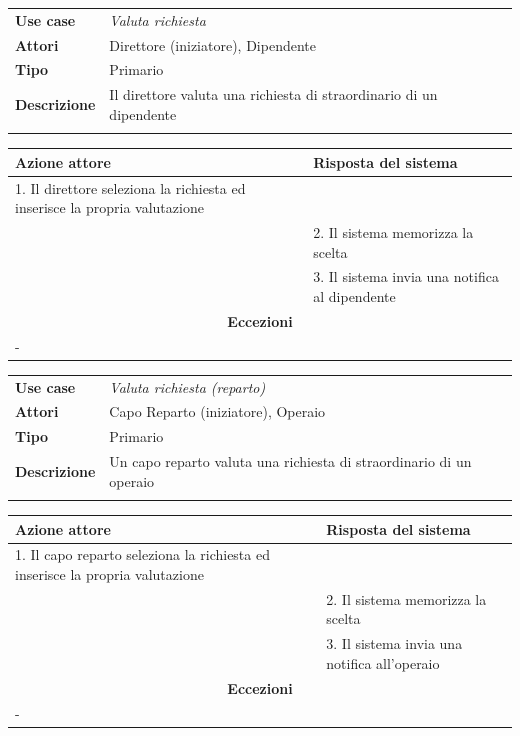 \documentclass{scrreprt}
\begin{document}
	\FloatBarrier
	\begin{table}[h|]
	\centering
	\begin{tabular}{p{3cm}p{11cm}}
	\textbf{Use case} & \textit{Valuta richiesta} \\ 
	\textbf{Attori} & Direttore (iniziatore), Dipendente \\ 
	\textbf{Tipo} & Primario \\ 
	\textbf{Descrizione} & Il direttore valuta una richiesta di straordinario di un dipendente \\
	\\
	\end{tabular}
	\centering
	\begin{tabular}{|p{7cm}|p{7cm}|}
	\hline
	\textbf{Azione attore} & \textbf{Risposta del sistema} \\ \hline
	1. Il direttore seleziona la richiesta ed inserisce la propria valutazione &                  \\ \hline
	 & 2. Il sistema memorizza la scelta \\ \hline
	& 3. Il sistema invia una notifica al dipendente\\ \hline
	\multicolumn{2}{|c|}{\textbf{Eccezioni}} \\ \hline
	\multicolumn{2}{|l|}{ - } \\ \hline
	\end{tabular}
	\end{table}
	\FloatBarrier
	
		\FloatBarrier
	\begin{table}[h|]
	\centering
	\begin{tabular}{p{3cm}p{11cm}}
	\textbf{Use case} & \textit {Valuta richiesta (reparto)} \\ 
	\textbf{Attori} & Capo Reparto (iniziatore), Operaio \\ 
	\textbf{Tipo} & Primario \\ 
	\textbf{Descrizione} & Un capo reparto valuta una richiesta di straordinario di un operaio\\
	\\
	\end{tabular}
	\centering
	\begin{tabular}{|p{7cm}|p{7cm}|}
	\hline
	\textbf{Azione attore} & \textbf{Risposta del sistema} \\ \hline
	1. Il capo reparto seleziona la richiesta ed inserisce la propria valutazione &                  \\ \hline
	 & 2. Il sistema memorizza la scelta \\ \hline
	& 3. Il sistema invia una notifica all'operaio\\ \hline
	\multicolumn{2}{|c|}{\textbf{Eccezioni}} \\ \hline
	\multicolumn{2}{|l|}{ - } \\ \hline
	\end{tabular}
	\end{table}
	\FloatBarrier
	
\end{document}
